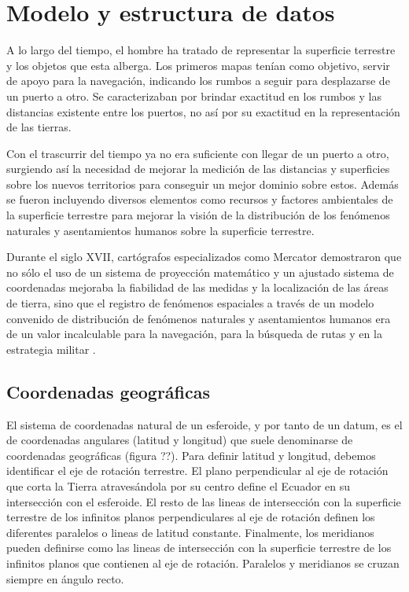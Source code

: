 \section{Modelo y estructura de datos}
\label{sec:cap2-modelo-estructura-datos}

A lo largo del tiempo, el hombre ha tratado de representar la superficie terrestre y los objetos que esta alberga.
Los primeros mapas tenían como objetivo, servir de apoyo para la navegación, indicando los rumbos a seguir para
desplazarse de un puerto a otro. Se caracterizaban por brindar exactitud en los rumbos y las distancias existente 
entre los puertos, no así por su exactitud en la representación de las tierras.

Con el trascurrir del tiempo ya no era suficiente con llegar de un puerto a otro, surgiendo así la necesidad de mejorar
la medición de las distancias y superficies sobre los nuevos territorios para conseguir un mejor dominio 
sobre estos. Además se fueron incluyendo diversos elementos como recursos y factores ambientales de la superficie
terrestre para mejorar la visión de la distribución de los fenómenos naturales y asentamientos humanos sobre 
la superficie terrestre.

Durante el siglo XVII, cartógrafos especializados como Mercator demostraron que no sólo el uso de un sistema de
proyección matemático y un ajustado sistema de coordenadas mejoraba la fiabilidad de las medidas y la localización de
las áreas de tierra, sino que el registro de fenómenos espaciales a través de un modelo convenido de distribución de
fenómenos naturales y asentamientos humanos era de un valor incalculable para la navegación, para la búsqueda de rutas
y en la estrategia militar \cite{jaualPenha2005}.

\subsection{Coordenadas geográficas}
El sistema de coordenadas natural de un esferoide, y por tanto de un datum, es el de coordenadas angulares
(latitud y longitud) que suele denominarse de coordenadas geográficas (figura ??). Para definir latitud y
longitud, debemos identificar el eje de rotación terrestre. El plano perpendicular al eje de rotación que corta la
Tierra atravesándola por su centro define el Ecuador en su intersección con el esferoide. El resto de las lineas
de intersección con la superficie terrestre de los infinitos planos perpendiculares al eje de rotación definen los
diferentes paralelos o lineas de latitud constante. Finalmente, los meridianos pueden definirse como las lineas
de intersección con la superficie terrestre de los infinitos planos que contienen al eje de rotación. Paralelos y
meridianos se cruzan siempre en ángulo recto.

